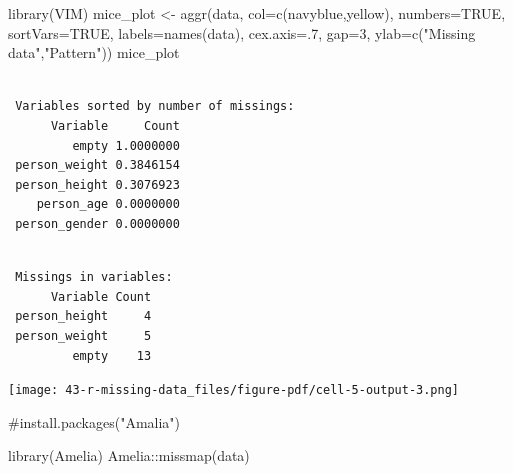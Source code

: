 \documentclass[
  letterpaper,
  DIV=11,
  numbers=noendperiod]{scrreprt}
\newenvironment{Shaded}{\begin{snugshade}}{\end{snugshade}}
\newcommand{\AttributeTok}[1]{\textcolor[rgb]{0.40,0.45,0.13}{#1}}
\newcommand{\CommentTok}[1]{\textcolor[rgb]{0.37,0.37,0.37}{#1}}
\newcommand{\ConstantTok}[1]{\textcolor[rgb]{0.56,0.35,0.01}{#1}}
\newcommand{\DecValTok}[1]{\textcolor[rgb]{0.68,0.00,0.00}{#1}}
\newcommand{\FunctionTok}[1]{\textcolor[rgb]{0.28,0.35,0.67}{#1}}
\newcommand{\NormalTok}[1]{\textcolor[rgb]{0.00,0.23,0.31}{#1}}
\newcommand{\OtherTok}[1]{\textcolor[rgb]{0.00,0.23,0.31}{#1}}
\newcommand{\SpecialCharTok}[1]{\textcolor[rgb]{0.37,0.37,0.37}{#1}}
\newcommand{\StringTok}[1]{\textcolor[rgb]{0.13,0.47,0.30}{#1}}
\begin{document}
\begin{Shaded}
\begin{Highlighting}[]
\FunctionTok{library}\NormalTok{(VIM)}
\NormalTok{mice\_plot }\OtherTok{\textless{}{-}} \FunctionTok{aggr}\NormalTok{(data, }
                  \AttributeTok{col=}\FunctionTok{c}\NormalTok{(}\StringTok{\textquotesingle{}navyblue\textquotesingle{}}\NormalTok{,}\StringTok{\textquotesingle{}yellow\textquotesingle{}}\NormalTok{),}
                  \AttributeTok{numbers=}\ConstantTok{TRUE}\NormalTok{, }
                  \AttributeTok{sortVars=}\ConstantTok{TRUE}\NormalTok{,}
                  \AttributeTok{labels=}\FunctionTok{names}\NormalTok{(data), }
                  \AttributeTok{cex.axis=}\NormalTok{.}\DecValTok{7}\NormalTok{,}
                  \AttributeTok{gap=}\DecValTok{3}\NormalTok{, }
                  \AttributeTok{ylab=}\FunctionTok{c}\NormalTok{(}\StringTok{"Missing data"}\NormalTok{,}\StringTok{"Pattern"}\NormalTok{))}
\NormalTok{mice\_plot}
\end{Highlighting}
\end{Shaded}

\begin{verbatim}

 Variables sorted by number of missings: 
      Variable     Count
         empty 1.0000000
 person_weight 0.3846154
 person_height 0.3076923
    person_age 0.0000000
 person_gender 0.0000000
\end{verbatim}

\begin{verbatim}

 Missings in variables:
      Variable Count
 person_height     4
 person_weight     5
         empty    13
\end{verbatim}

\texttt{[image: 43-r-missing-data\_files/figure-pdf/cell-5-output-3.png]}

\begin{Shaded}
\begin{Highlighting}[]
\CommentTok{\#install.packages("Amalia")}
\end{Highlighting}
\end{Shaded}

\begin{Shaded}
\begin{Highlighting}[]
\FunctionTok{library}\NormalTok{(Amelia)}
\NormalTok{Amelia}\SpecialCharTok{::}\FunctionTok{missmap}\NormalTok{(data)}
\end{Highlighting}
\end{Shaded}
\end{document}
